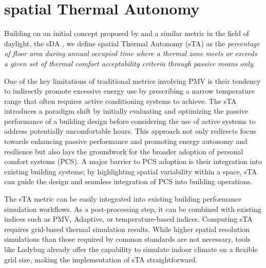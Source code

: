 
\section{spatial Thermal Autonomy}
\label{sec:sta}


Building on an initial concept proposed by \citet{levitt_thermal_2013} and a similar metric in the field of daylight, the sDA \citep{heschong_approved_2012}, we define spatial Thermal Autonomy (sTA) as the \textit{percentage of floor area during annual occupied time where a thermal zone meets or exceeds a given set of thermal comfort acceptability criteria through passive means only}.

One of the key limitations of traditional metrics involving PMV is their tendency to indirectly promote excessive energy use by prescribing a narrow temperature range that often requires active conditioning systems to achieve. The sTA introduces a paradigm shift by initially evaluating and optimizing the passive performance of a building design before considering the use of active systems to address potentially uncomfortable hours. This approach not only redirects focus towards enhancing passive performance and promoting energy autonomy and resilience but also lays the groundwork for the broader adoption of personal comfort systems (PCS). A major barrier to PCS adoption is their integration into existing building systems; by highlighting spatial variability within a space, sTA can guide the design and seamless integration of PCS into building operations.

The sTA metric can be easily integrated into existing building performance simulation workflows. As a post-processing step, it can be combined with existing indices such as PMV, Adaptive, or temperature-based indices. Computing sTA requires grid-based thermal simulation results. While higher spatial resolution simulations than those required by common standards are not necessary, tools like Ladybug already offer the capability to simulate indoor climate on a flexible grid size, making the implementation of sTA straightforward.



